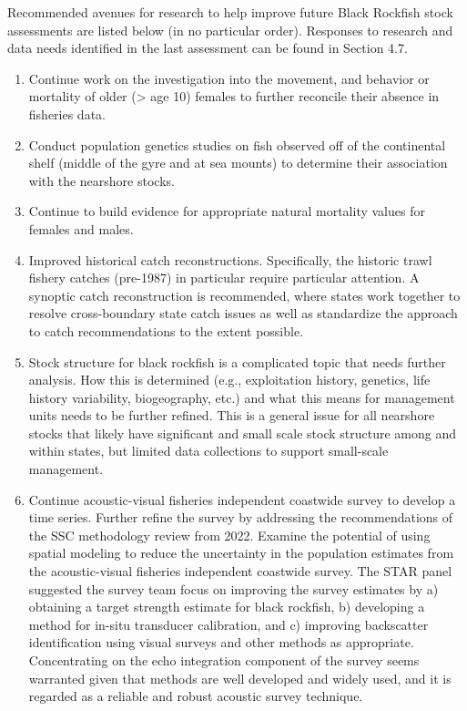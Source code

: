 \documentclass[11pt,
  english,
  letterpaper,
]{article}
\providecommand{\tightlist}{%
  \setlength{\itemsep}{0pt}\setlength{\parskip}{0pt}}
\providecommand{\tightlist}{%
  \setlength{\itemsep}{0pt}\setlength{\parskip}{0pt}}
\begin{document}
Recommended avenues for research to help improve future Black Rockfish stock assessments are listed below (in no particular order). Responses to research and data needs identified in the last assessment can be found in Section 4.7.

\begin{enumerate}
\def\labelenumi{\arabic{enumi}.}
\tightlist
\item
  Continue work on the investigation into the movement, and behavior or mortality of older (\textgreater{} age 10) females to further reconcile their absence in fisheries data.
\item
  Conduct population genetics studies on fish observed off of the continental shelf (middle of the gyre and at sea mounts) to determine their association with the nearshore stocks.
\item
  Continue to build evidence for appropriate natural mortality values for females and males.
\item
  Improved historical catch reconstructions. Specifically, the historic trawl fishery catches (pre-1987) in particular require particular attention. A synoptic catch reconstruction is recommended, where states work together to resolve cross-boundary state catch issues as well as standardize the approach to catch recommendations to the extent possible.
\item
  Stock structure for black rockfish is a complicated topic that needs further analysis. How this is determined (e.g., exploitation history, genetics, life history variability, biogeography, etc.) and what this means for management units needs to be further refined. This is a general issue for all nearshore stocks that likely have significant and small scale stock structure among and within states, but limited data collections to support small-scale management.
\item
  Continue acoustic-visual fisheries independent coastwide survey to develop a time series. Further refine the survey by addressing the recommendations of the SSC methodology review from 2022. Examine the potential of using spatial modeling to reduce the uncertainty in the population estimates from the acoustic-visual fisheries independent coastwide survey. The STAR panel suggested the survey team focus on improving the survey estimates by a) obtaining a target strength estimate for black rockfish, b) developing a method for in-situ transducer calibration, and c) improving backscatter identification using visual surveys and other methods as appropriate. Concentrating on the echo integration component of the survey seems warranted given that methods are well developed and widely used, and it is regarded as a reliable and robust acoustic survey technique.

\end{enumerate}
\end{document}
